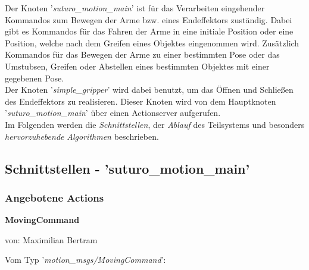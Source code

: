 \documentclass{suturo}
\makeatletter
\newcommand{\chapterauthor}[1]{%
  {\parindent0pt\vspace*{-27pt}%
  \linespread{0}\small\begin{flushright}von: #1\end{flushright}%
  \par\nobreak\vspace*{0pt}}
  \@afterheading%
}
\makeatother
\begin{document}
Der Knoten '\textit{suturo\_motion\_main}' ist für das Verarbeiten eingehender Kommandos zum Bewegen der Arme bzw. eines Endeffektors zuständig. Dabei gibt es Kommandos für das Fahren der Arme in eine initiale Position oder eine Position, welche nach dem Greifen eines Objektes eingenommen wird. Zusätzlich Kommandos für das Bewegen der Arme zu einer bestimmten Pose oder das Umstubsen, Greifen oder Abstellen eines bestimmten Objektes mit einer gegebenen Pose.\\
Der Knoten '\textit{simple\_gripper}' wird dabei benutzt, um das Öffnen und Schließen des Endeffektors zu realisieren. Dieser Knoten wird von dem Hauptknoten '\textit{suturo\_motion\_main}' über einen Actionserver aufgerufen.\\

Im Folgenden werden die \textit{Schnittstellen}, der \textit{Ablauf} des Teilsystems und besonders \textit{hervorzuhebende} \textit{Algorithmen} beschrieben.\\

\subsection{Schnittstellen - 'suturo\_motion\_main'}
\subsubsection{Angebotene Actions}
\textbf{MovingCommand}
\chapterauthor{Maximilian Bertram}
Vom Typ '\textit{motion\_msgs/MovingCommand}': \\
\end{document}
